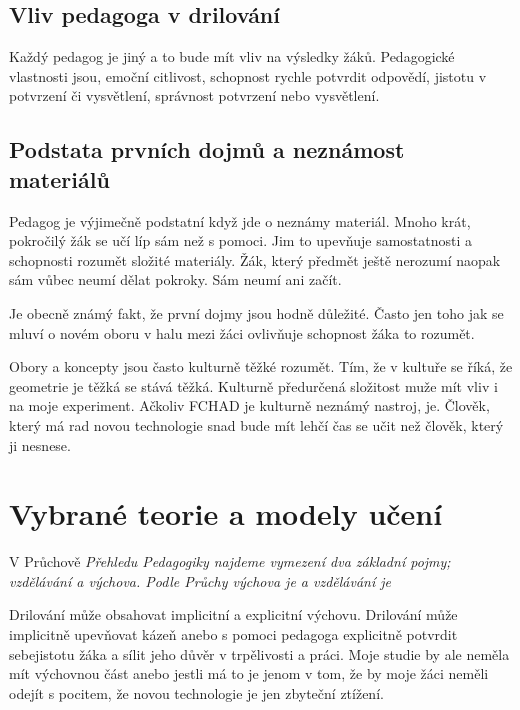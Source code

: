\subsection{Vliv pedagoga v drilování}

Každý pedagog je jiný a to bude mít vliv na výsledky žáků.  Pedagogické vlastnosti jsou, emoční citlivost, schopnost rychle potvrdit odpovědí, jistotu v potvrzení či vysvětlení, správnost potvrzení nebo vysvětlení.

\subsection{Podstata prvních dojmů a neznámost materiálů}

Pedagog je výjimečně podstatní když jde o neznámy materiál.  Mnoho krát, pokročilý žák se učí líp sám než s pomoci.  Jim to upevňuje samostatnosti a schopnosti rozumět složité materiály.  Žák, který předmět ještě nerozumí naopak sám vůbec neumí dělat pokroky.  Sám neumí ani začít.

Je obecně známý fakt, že první dojmy jsou hodně důležité.  Často jen toho jak se mluví o novém oboru v halu mezi žáci ovlivňuje schopnost žáka to rozumět.

Obory a koncepty jsou často kulturně těžké rozumět.  Tím, že v kultuře se říká, že geometrie je těžká se stává těžká.  Kulturně předurčená složitost muže mít vliv i na moje experiment. Ačkoliv FCHAD je kulturně neznámý nastroj,  je.  Člověk, který má rad novou technologie snad bude mít lehčí čas se učit než člověk, který ji nesnese.

\section{Vybrané teorie a modely učení}

V Průchově \em Přehledu Pedagogiky \em najdeme vymezení dva základní pojmy; vzdělávání a výchova.  Podle Průchy výchova je  a vzdělávání je \citep[str. 16-17]{prucha2009prehled}

Drilování může obsahovat implicitní a explicitní výchovu.  Drilování může implicitně upevňovat kázeň anebo s pomoci pedagoga explicitně potvrdit sebejistotu žáka a sílit jeho důvěr v trpělivosti a práci.  Moje studie by ale neměla mít výchovnou část anebo jestli má to je jenom v tom, že by moje žáci neměli odejít s pocitem, že novou technologie je jen zbyteční ztížení.

